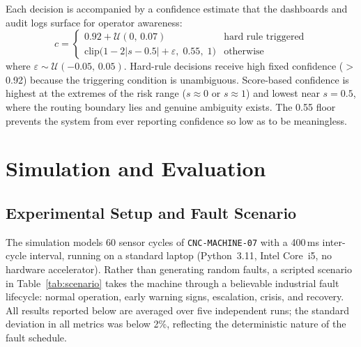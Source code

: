 \documentclass[conference]{IEEEtran}
\begin{document}
Each decision is accompanied by a confidence estimate that the
dashboards and audit logs surface for operator awareness:
\begin{equation}
  c =
  \begin{cases}
    0.92 + \mathcal{U}(0,\,0.07)
      & \text{hard rule triggered} \\[4pt]
    \text{clip}\!\bigl(
      1 - 2|s - 0.5| + \varepsilon,\; 0.55,\; 1
    \bigr)
      & \text{otherwise}
  \end{cases}
  \label{eq:conf}
\end{equation}
where $\varepsilon \sim \mathcal{U}(-0.05,\,0.05)$.
Hard-rule decisions receive high fixed confidence ($>$0.92) because
the triggering condition is unambiguous.
Score-based confidence is highest at the extremes of the risk range
($s \approx 0$ or $s \approx 1$) and lowest near $s = 0.5$, where
the routing boundary lies and genuine ambiguity exists.
The 0.55 floor prevents the system from ever reporting confidence so
low as to be meaningless.


\section{Simulation and Evaluation}
\label{sec:eval}

\subsection{Experimental Setup and Fault Scenario}
\label{subsec:scenario}

The simulation models 60 sensor cycles of \texttt{CNC-MACHINE-07}
with a 400\,ms inter-cycle interval, running on a standard laptop
(Python~3.11, Intel Core~i5, no hardware accelerator).
Rather than generating random faults, a scripted scenario in
Table~\ref{tab:scenario} takes the machine through a believable
industrial fault lifecycle: normal operation, early warning signs,
escalation, crisis, and recovery.
All results reported below are averaged over five independent runs;
the standard deviation in all metrics was below 2\%, reflecting the
deterministic nature of the fault schedule.
\end{document}
